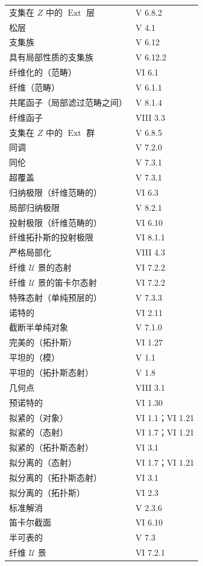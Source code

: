 \begin{longtable}{p{}p{}}
支集在 $Z$ 中的 $\operatorname{Ext}$ 层 & V 6.8.2\\
松层 & V 4.1\\
支集族 & V 6.12\\
具有局部性质的支集族 & V 6.12.2\\
纤维化的（范畴） & VI 6.1\\
纤维（范畴） & V 6.1.1\\
共尾函子（局部滤过范畴之间） & V 8.1.4\\
纤维函子 & VIII 3.3\\
支集在 $Z$ 中的 $\operatorname{Ext}$ 群 & V 6.8.5\\
同调 & V 7.2.0\\
同伦 & V 7.3.1\\
超覆盖 & V 7.3.1\\
归纳极限（纤维范畴的） & VI 6.3\\
局部归纳极限 & V 8.2.1\\
投射极限（纤维范畴的） & VI 6.10\\
纤维拓扑斯的投射极限 & VI 8.1.1\\
严格局部化 & VIII 4.3\\
纤维 $\mathcal U$ 景的态射 & VI 7.2.2\\
纤维 $\mathcal U$ 景的笛卡尔态射 & VI 7.2.2\\
特殊态射（单纯预层的） & V 7.3.3\\
诺特的 & VI 2.11\\
截断半单纯对象 & V 7.1.0\\
完美的（拓扑斯） & VI 1.27\\
平坦的（模） & V 1.1\\
平坦的（拓扑斯态射） & V 1.8\\
几何点 & VIII 3.1\\
预诺特的 & VI 1.30\\
拟紧的（对象） & VI 1.1；VI 1.21\\
拟紧的（态射） & VI 1.7；VI 1.21\\
拟紧的（拓扑斯态射） & VI 3.1\\
拟分离的（态射） & VI 1.7；VI 1.21\\
拟分离的（拓扑斯态射） & VI 3.1\\
拟分离的（拓扑斯） & VI 2.3\\
标准解消 & V 2.3.6\\
笛卡尔截面 & VI 6.10\\
半可表的 & V 7.3\\
纤维 $\mathcal U$ 景 & VI 7.2.1\\
\end{longtable}
